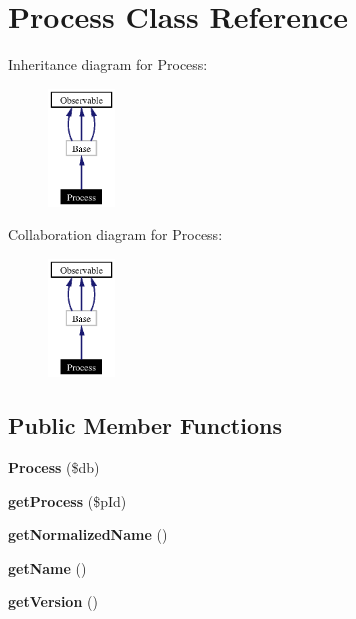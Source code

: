 \section{Process Class Reference}
\label{classProcess}
Inheritance diagram for Process:\begin{figure}[H]
\begin{center}
\leavevmode
\includegraphics[width=50pt]{classProcess__inherit__graph}
\end{center}
\end{figure}
Collaboration diagram for Process:\begin{figure}[H]
\begin{center}
\leavevmode
\includegraphics[width=50pt]{classProcess__coll__graph}
\end{center}
\end{figure}
\subsection*{Public Member Functions}
\begin{CompactItemize}
\item 
{}
{\bf Process} (\$db)\label{classProcess_a0}

\item 
{\bf get\-Process} (\$p\-Id)
\item 
{\bf get\-Normalized\-Name} ()
\item 
{\bf get\-Name} ()
\item 
{\bf get\-Version} ()
\end{CompactItemize}
